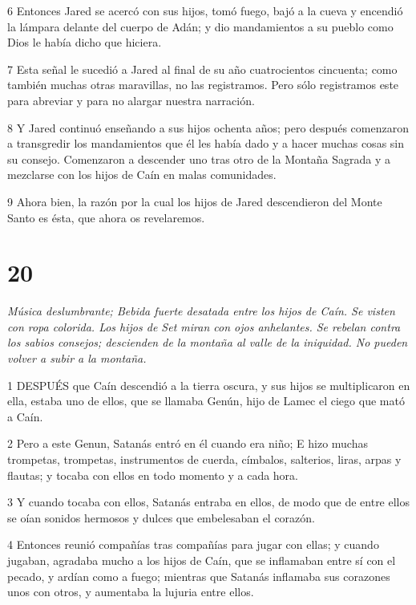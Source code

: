 \par 6 Entonces Jared se acercó con sus hijos, tomó fuego, bajó a la cueva y encendió la lámpara delante del cuerpo de Adán; y dio mandamientos a su pueblo como Dios le había dicho que hiciera.

\par 7 Esta señal le sucedió a Jared al final de su año cuatrocientos cincuenta; como también muchas otras maravillas, no las registramos. Pero sólo registramos este para abreviar y para no alargar nuestra narración.

\par 8 Y Jared continuó enseñando a sus hijos ochenta años; pero después comenzaron a transgredir los mandamientos que él les había dado y a hacer muchas cosas sin su consejo. Comenzaron a descender uno tras otro de la Montaña Sagrada y a mezclarse con los hijos de Caín en malas comunidades.

\par 9 Ahora bien, la razón por la cual los hijos de Jared descendieron del Monte Santo es ésta, que ahora os revelaremos.



\chapter{20}

\par \textit{Música deslumbrante; Bebida fuerte desatada entre los hijos de Caín. Se visten con ropa colorida. Los hijos de Set miran con ojos anhelantes. Se rebelan contra los sabios consejos; descienden de la montaña al valle de la iniquidad. No pueden volver a subir a la montaña.}

\par 1 DESPUÉS que Caín descendió a la tierra oscura, y sus hijos se multiplicaron en ella, estaba uno de ellos, que se llamaba Genún, hijo de Lamec el ciego que mató a Caín.

\par 2 Pero a este Genun, Satanás entró en él cuando era niño; E hizo muchas trompetas, trompetas, instrumentos de cuerda, címbalos, salterios, liras, arpas y flautas; y tocaba con ellos en todo momento y a cada hora.

\par 3 Y cuando tocaba con ellos, Satanás entraba en ellos, de modo que de entre ellos se oían sonidos hermosos y dulces que embelesaban el corazón.

\par 4 Entonces reunió compañías tras compañías para jugar con ellas; y cuando jugaban, agradaba mucho a los hijos de Caín, que se inflamaban entre sí con el pecado, y ardían como a fuego; mientras que Satanás inflamaba sus corazones unos con otros, y aumentaba la lujuria entre ellos.

